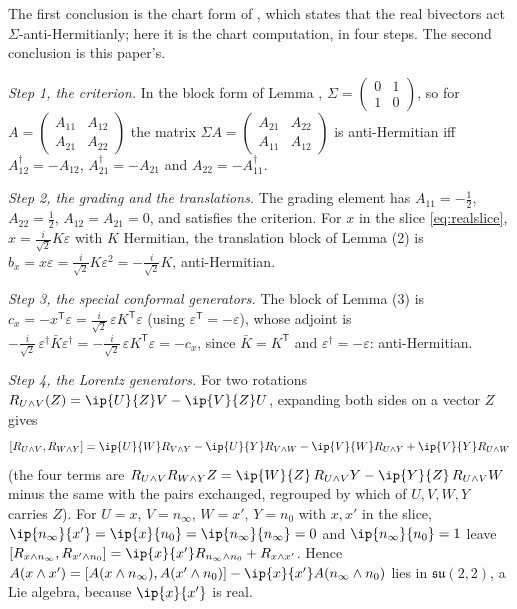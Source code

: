 The first conclusion is the chart form of \cite[Prop.~4.5(2)]{ButlerT9}, which states that the real bivectors act $\Sigma$-anti-Hermitianly; here it is the chart computation, in four steps. The second conclusion is this paper's.

\emph{Step 1, the criterion.} In the block form of Lemma , $\Sigma = \left(\begin{smallmatrix} 0 & 1 \\ 1 & 0\end{smallmatrix}\right)$, so for $A = \left(\begin{smallmatrix} A_{11} & A_{12} \\ A_{21} & A_{22}\end{smallmatrix}\right)$ the matrix $\Sigma A = \left(\begin{smallmatrix} A_{21} & A_{22} \\ A_{11} & A_{12}\end{smallmatrix}\right)$ is anti-Hermitian iff $A_{12}^{\dagger} = -A_{12}$, $A_{21}^{\dagger} = -A_{21}$ and $A_{22} = -A_{11}^{\dagger}$.

\emph{Step 2, the grading and the translations.} The grading element has $A_{11} = -\tfrac12$, $A_{22} = \tfrac12$, $A_{12} = A_{21} = 0$, and satisfies the criterion. For $x$ in the slice \eqref{eq:realslice}, $x = \tfrac{i}{\sqrt2}K\varepsilon$ with $K$ Hermitian, the translation block of Lemma (2) is $b_{x} = x\varepsilon = \tfrac{i}{\sqrt2}K\varepsilon^{2} = -\tfrac{i}{\sqrt2}K$, anti-Hermitian.

\emph{Step 3, the special conformal generators.} The block of Lemma (3) is $c_{x} = -x^{\mathsf T}\varepsilon = \tfrac{i}{\sqrt2}\,\varepsilon K^{\mathsf T}\varepsilon$ (using $\varepsilon^{\mathsf T} = -\varepsilon$), whose adjoint is $-\tfrac{i}{\sqrt2}\,\varepsilon^{\dagger}\bar{K}\varepsilon^{\dagger} = -\tfrac{i}{\sqrt2}\,\varepsilon K^{\mathsf T}\varepsilon = -c_{x}$, since $\bar K = K^{\mathsf T}$ and $\varepsilon^{\dagger} = -\varepsilon$: anti-Hermitian.

\emph{Step 4, the Lorentz generators.} For two rotations $R_{U\wedge V}(Z) = \ip{U}{Z}V - \ip{V}{Z}U$, expanding both sides on a vector $Z$ gives
\[
[R_{U\wedge V}, R_{W\wedge Y}] = \ip{U}{W}R_{V\wedge Y} - \ip{U}{Y}R_{V\wedge W} - \ip{V}{W}R_{U\wedge Y} + \ip{V}{Y}R_{U\wedge W}
\]
(the four terms are $R_{U\wedge V}R_{W\wedge Y}Z = \ip{W}{Z}\,R_{U\wedge V}Y - \ip{Y}{Z}\,R_{U\wedge V}W$ minus the same with the pairs exchanged, regrouped by which of $U, V, W, Y$ carries $Z$). For $U = x$, $V = n_{\infty}$, $W = x'$, $Y = n_{0}$ with $x, x'$ in the slice, $\ip{n_{\infty}}{x'} = \ip{x}{n_{0}} = \ip{n_{\infty}}{n_{\infty}} = 0$ and $\ip{n_{\infty}}{n_{0}} = 1$ leave $[R_{x\wedge n_{\infty}}, R_{x'\wedge n_{0}}] = \ip{x}{x'}R_{n_{\infty}\wedge n_{0}} + R_{x\wedge x'}$. Hence $A(x\wedge x') = [A(x\wedge n_{\infty}), A(x'\wedge n_{0})] - \ip{x}{x'}A(n_{\infty}\wedge n_{0})$ lies in $\mathfrak{su}(2,2)$, a Lie algebra, because $\ip{x}{x'}$ is real.

